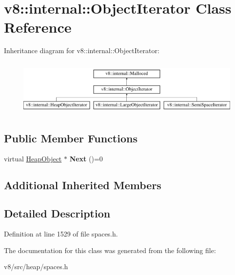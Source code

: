 \hypertarget{classv8_1_1internal_1_1ObjectIterator}{}\section{v8\+:\+:internal\+:\+:Object\+Iterator Class Reference}
\label{classv8_1_1internal_1_1ObjectIterator}
Inheritance diagram for v8\+:\+:internal\+:\+:Object\+Iterator\+:\begin{figure}[H]
\begin{center}
\leavevmode
\includegraphics[height=2.828283cm]{classv8_1_1internal_1_1ObjectIterator}
\end{center}
\end{figure}
\subsection*{Public Member Functions}
\begin{DoxyCompactItemize}
\item 
\mbox{\label{classv8_1_1internal_1_1ObjectIterator_adc8a209e475bf99b3e228eca30da5a96}} 
virtual \mbox{\hyperlink{classv8_1_1internal_1_1HeapObject}{Heap\+Object}} $\ast$ {\bfseries Next} ()=0
\end{DoxyCompactItemize}
\subsection*{Additional Inherited Members}


\subsection{Detailed Description}


Definition at line 1529 of file spaces.\+h.



The documentation for this class was generated from the following file\+:\begin{DoxyCompactItemize}
\item 
v8/src/heap/spaces.\+h\end{DoxyCompactItemize}
